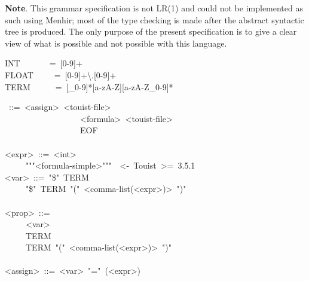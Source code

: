 \noindent\textbf{Note}.
This grammar specification is not LR(1) and could not be implemented as
such using Menhir; most of the type checking is made after the abstract
syntactic tree is produced. The only purpose of the present specification
is to give a clear view of what is possible and not possible with this
language.%
\begin{mdpre}%
\noindent INT~~~~~~~=~{}[0-9]+\\
FLOAT~~~~~=~{}[0-9]+\textbackslash{}.{}[0-9]+\\
TERM~~~~~~=~{}[\_0-9]*{}[a-zA-Z]{}[a-zA-Z\_0-9]*%
\end{mdpre}\begin{mdpre}%
~::=~{\textless{}assign\textgreater{}}~{\textless{}touist-file\textgreater{}}\\
~~~~~~~~~~~~~~~~~\textbar{}~{\textless{}formula\textgreater{}}~{\textless{}touist-file\textgreater{}}\\
~~~~~~~~~~~~~~~~~\textbar{}~EOF\\
\\
{\textless{}expr\textgreater{}}~::=~{\textless{}int\textgreater{}}\\
~~~~\textbar{}~"""{\textless{}formula-simple\textgreater{}}"""~~{\textless{}-~Touist~\textgreater{}=~3.5.1}\\
{\textless{}var\textgreater{}}~::=~"\$"~TERM\\
~~~~\textbar{}~"\$"~TERM~"("~{\textless{}comma-list(\textless{}expr\textgreater{})\textgreater{}}~")"\\
\\
{\textless{}prop\textgreater{}}~::=\\
~~~~\textbar{}~{\textless{}var\textgreater{}}\\
~~~~\textbar{}~TERM\\
~~~~\textbar{}~TERM~"("~{\textless{}comma-list(\textless{}expr\textgreater{})\textgreater{}}~")"\\
\\
{\textless{}assign\textgreater{}}~::=~{\textless{}var\textgreater{}}~"="~({\textless{}expr\textgreater{}})\\

\end{mdpre}
